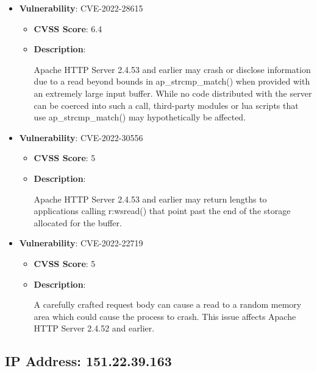 \documentclass{article}
\begin{document}
\begin{itemize}
        \item \textbf{Vulnerability}: CVE-2022-28615
        \begin{itemize}
            \item \textbf{CVSS Score}:  6.4 
            \item \textbf{Description}:
            \parbox[t]{0.9\linewidth}{
                \ttfamily Apache HTTP Server 2.4.53 and earlier may crash or disclose information due to a read beyond bounds in ap\_strcmp\_match() when provided with an extremely large input buffer. While no code distributed with the server can be coerced into such a call, third-party modules or lua scripts that use ap\_strcmp\_match() may hypothetically be affected.
            }
        \end{itemize}
    
        \item \textbf{Vulnerability}: CVE-2022-30556
        \begin{itemize}
            \item \textbf{CVSS Score}:  5 
            \item \textbf{Description}:
            \parbox[t]{0.9\linewidth}{
                \ttfamily Apache HTTP Server 2.4.53 and earlier may return lengths to applications calling r:wsread() that point past the end of the storage allocated for the buffer.
            }
        \end{itemize}
    
        \item \textbf{Vulnerability}: CVE-2022-22719
        \begin{itemize}
            \item \textbf{CVSS Score}:  5 
            \item \textbf{Description}:
            \parbox[t]{0.9\linewidth}{
                \ttfamily A carefully crafted request body can cause a read to a random memory area which could cause the process to crash. This issue affects Apache HTTP Server 2.4.52 and earlier.
            }
        \end{itemize}
    
\end{itemize}




\clearpage



\subsection*{IP Address: 151.22.39.163}
\end{document}
